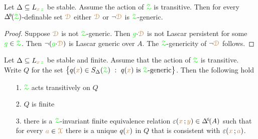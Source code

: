 \begin{corollary}\label{corol_genericornotgeneric}
  Let $\Delta\subseteq L_{{\color{brown} x}\,{\color{green} z}}$ be stable.
  Assume the action of ${\color{green}\EuScript Z}$ is transitive.
  Then for every $\BDelta(\grZ)$-definable set ${\color{brown}\EuScript D}$ either ${\color{brown}\EuScript D}$ or $\neg{\color{brown}\EuScript D}$ is ${\color{green}\EuScript Z}$-generic.
\end{corollary}

\begin{proof}
  Suppose ${\color{brown}\EuScript D}$ is not ${\color{green}\EuScript Z}$-generic.
  Then ${\color{green} g}{\cdot}{\color{brown}\EuScript D}$ is not Lascar persistent for some ${\color{green} g}\in{\color{green}\EuScript Z}$.
  Then $\neg({\color{green} g}{\cdot}{\color{brown}\EuScript D})$ is Lascar generic over $A$.
  The ${\color{green}\EuScript Z}$-genericity of $\neg{\color{brown}\EuScript D}$ follows.
\end{proof}

\begin{corollary}
  Let $\Delta\subseteq L_{{\color{brown} x}\,{\color{green} z}}$ be stable and finite.
  Assume that the action of ${\color{green}\EuScript Z}$ is transitive.
  Write $Q$ for the set $\big\{q({\color{brown} x})\in S_\Delta({\color{green}\EuScript Z})\ :\ q({\color{brown} x})\textrm{ is }{\color{green}\EuScript Z}\textrm{-generic}\big\}$.
  Then the following hold
  \begin{itemize}
    \item [1.] ${\color{green}\EuScript Z}$ acts transitively on $Q$
    \item [2.] $Q$ is finite
    \item [3.] there is a ${\color{green}\EuScript Z}$-invariant finite equivalence relation $\epsilon({\mr x}\,;{\mr y})\in\GDelta(A)$ such that for every ${\color{brown} a}\in{\color{brown}\EuScript X}$ there is a unique $q({\color{brown} x})$ in $Q$ that is consistent with $\varepsilon({\color{brown} x}\,;{\color{brown} a})$.
  \end{itemize}
\end{corollary}

